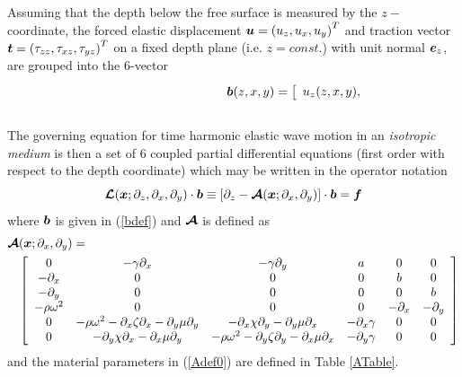 Assuming that the depth below the free surface is measured by the 
$z-$coordinate, the forced elastic displacement ${\mbox{\boldmath$\mit u$\unboldmath}} = {({u}_{z},{u}_{x},{u}_{y})}^{T}$
and traction vector ${\mbox{\boldmath$\mit t$\unboldmath}} = {({\tau}_{zz},{\tau}_{xz},{\tau}_{yz})}^{T }$ on a 
fixed depth plane (i.e. $z=const.$) with unit
normal ${\mbox{\boldmath$\mit e$\unboldmath}}_{z}$,  are grouped into the $6$-vector
\begin{eqnarray} \label{bdef}
\lefteqn{{\bmi  b}  (z,x,y)= {  \left[ \begin{array}{cccccc}{ u}_{ z}
(z,x,y),&{u}_{x}(z,x,y),&{u}_{y}(z,x,y),&{\tau}_{zz}(z,x,y),&{\tau}_{xz}(z,x,y),&
{\tau}_{yz}(z,x,y)\end{array} \right]}^{  T }.}\nonumber\\
&&
\end{eqnarray}
The governing equation for time harmonic elastic wave motion in an {\em isotropic  medium\/} 
is then a 
set of $6$ coupled partial differential equations (first order with respect 
to the depth coordinate) which may be written in the operator notation
\begin{equation} \label{govEqn00} 
{\mbox{\boldmath$\cal L$\unboldmath}}({\mbox{\boldmath$\mit x$\unboldmath}};{\partial }_{z},{\partial }_{x},{\partial }_{y})\cdot {\mbox{\boldmath$\mit b$\unboldmath} }\equiv\left[\partial_{z}-{\mbox{\boldmath$\cal A$\unboldmath}}({\mbox{\boldmath$\mit x$\unboldmath}};{\partial }_{x},{\partial }_{y})\right]\cdot {\mbox{\boldmath$\mit b$\unboldmath} }=
{\mbox{\boldmath$\mit f$\unboldmath}}
\end{equation}
where ${\mbox{\boldmath$\mit b$\unboldmath}}$ is given in (\ref{bdef})  and 
${\mbox{\boldmath$\cal A$\unboldmath}}$ is defined as
\begin{eqnarray} \label{Adef0}
\lefteqn{{\CB A}({\bmi x};{\partial }_{x},{\partial }_{y})=}\nonumber\\
&&\left[{\begin{array}{cccccc}
0&- \gamma {\partial }_{  x}&  - \gamma {\partial }_{  y}&  a&0&0\\ 
-{ \partial }_{x}&0&0&0&b&0\\ 
-{\partial }_{y}&0&0&0&0&b\\ 
- \rho {\omega }^{  2}&  0&0&0&-{ \partial }_{x}&-{ \partial }_{y}\\ 
0&- \rho {\omega }^{  2}  -{\partial }_{x} \zeta {\partial }_{  x}  -{ \partial }_{y} \mu 
{\partial }_{  y}&  -{ \partial }_{x} \chi {\partial }_{  y} 
 -{ \partial }_{y} \mu {\partial }_{  x}&  -{ \partial }_{x} \gamma &  0&0\\
 0&-{ \partial }_{y} \chi {\partial }_{  x}  -{ \partial }_{x} \mu {\partial }_{  y}&
   - \rho {\omega }^{  2}  -{ \partial }_{y} \zeta {\partial }_{  y} 
 -{ \partial }_{x} \mu {\partial }_{  x}&  -{ \partial }_{y} \gamma &  0&0\end{array}}
 \right]
\end{eqnarray} 
and the material parameters in (\ref{Adef0}) are defined in Table \ref{ATable}.

